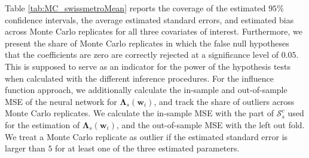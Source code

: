\documentclass[a4paper, 12pt]{article}
\begin{document}
Table \ref{tab:MC_swissmetroMean} reports the coverage of the estimated $95\%$ confidence intervals, the average estimated standard errors, and estimated bias across  Monte Carlo replicates for all three covariates of interest. 
Furthermore, we present the share of Monte Carlo replicates in which the false null hypotheses that the coefficients are zero are correctly rejected at a significance level of $0.05$. This is supposed to serve as an indicator for the power of the hypothesis tests when calculated with the different inference procedures. 
For the influence function approach, we additionally calculate the in-sample and out-of-sample MSE of the neural network for $\bm{\Lambda}_s(\bm{w}_i)$, and  track the share of outliers across Monte Carlo replicates. We calculate the in-sample MSE with the part of $\mathcal{S}^c_s$ used for the estimation of $\bm{\Lambda}_s(\bm{w}_i)$, and the out-of-sample MSE with the left out fold. We treat a Monte Carlo replicate as outlier if the estimated standard error is larger than $5$ for at least one of the three estimated parameters.
\end{document}
